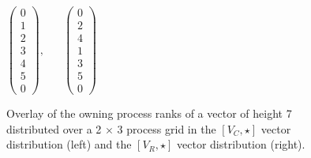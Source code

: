 \begin{figure}
\centering
$
\left(\begin{array}{c}
 0 \\
 1 \\
 2 \\
 3 \\
 4 \\
 5 \\
 0  
\end{array}\right),\;\;\;\;\;\;
\left(\begin{array}{c}
 0 \\
 2 \\
 4 \\
 1 \\
 3 \\
 5 \\
 0 
\end{array}\right)
$
\caption{Overlay of the owning process ranks of a vector of height 7 
distributed over a 2 $\times$ 3 process grid in the $[V_C,\star]$ vector 
distribution (left) and the $[V_R,\star]$ vector distribution (right).}
\label{fig:vector}
\end{figure}
